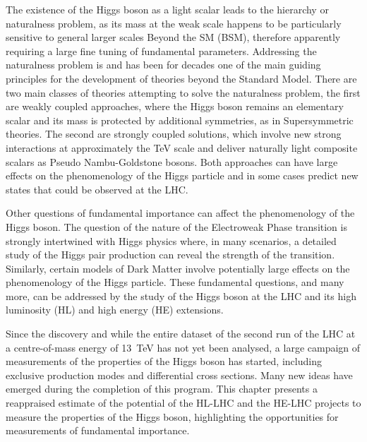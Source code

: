 \documentclass[../report.tex]{subfiles}
\begin{document}
The existence of the Higgs boson as a light scalar leads to the
hierarchy or naturalness problem, as its mass at the weak scale happens to be particularly sensitive to general larger scales Beyond the SM (BSM), therefore apparently requiring a large fine tuning of fundamental parameters.
Addressing the naturalness problem is and has been for decades one of
the main guiding principles for the development of theories beyond the
Standard Model. 
There are two main classes of theories attempting
to solve the naturalness problem, the first are weakly coupled approaches, 
where the Higgs boson
remains an elementary scalar and its mass is protected by additional
symmetries, as in Supersymmetric theories. 
The second are strongly
coupled solutions, which involve new strong interactions at approximately the TeV
scale and deliver naturally light composite scalars as Pseudo Nambu-Goldstone bosons. Both approaches can have large effects on the phenomenology
of the Higgs particle and in some cases predict new states that could be 
observed at the LHC.

Other questions of fundamental importance can affect the phenomenology
of the Higgs boson.  The question of the nature of the Electroweak Phase transition is strongly intertwined with Higgs physics where, in many scenarios, a detailed study of the Higgs pair production can reveal the strength of the transition.
Similarly, certain models of Dark Matter involve
potentially large effects on the phenomenology of the Higgs
particle.
These fundamental questions, and many more, can be addressed by the study of the
Higgs boson at the LHC and its high luminosity (HL) and high energy
(HE) extensions.



Since the discovery and while the entire dataset of the second run of
the LHC at a centre-of-mass energy of 13~TeV has not yet been
analysed, a large campaign of measurements of the properties of the
Higgs boson has started, including exclusive production modes and
differential cross sections. Many new ideas have emerged during the
completion of this program. This chapter presents a reappraised
estimate of the potential of the HL-LHC and the HE-LHC projects to
measure the properties of the Higgs boson, highlighting the
opportunities for measurements of fundamental importance.
\end{document}
